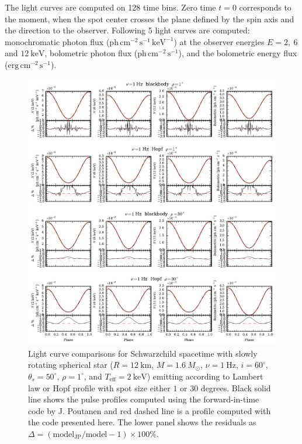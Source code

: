 \documentclass[iop, usenatbib]{emulateapj}
\newcommand{\Msun}{\ensuremath{M_{\odot}}}
\begin{document}
The light curves are computed on 128 time bins.
Zero time $t = 0$ corresponds to the moment, when the spot center crosses the plane defined by the spin axis and the direction to the observer.
Following 5 light curves are computed: monochromatic photon flux ($\mathrm{ph}\,\mathrm{cm}^{-2}\,\mathrm{s}^{-1}\,\mathrm{keV}^{-1}$) at the observer energies $E = 2,~6$ and $12~\mathrm{keV}$, bolometric photon flux ($\mathrm{ph}\,\mathrm{cm}^{-2}\,\mathrm{s}^{-1}$), and the bolometric energy flux ($\mathrm{erg}\,\mathrm{cm}^{-2}\,\mathrm{s}^{-1}$).


\begin{figure}
\centering
\includegraphics[width=18cm]{figs/fig2a.pdf}
\caption{\label{fig:sch_comp1}
  Light curve comparisons for Schwarzchild spacetime with slowly rotating spherical star ($R = 12~\mathrm{km}$, $M = 1.6~\Msun$, $\nu = 1~\mathrm{Hz}$, $i = 60^{\circ}$, $\theta_s = 50^{\circ}$, $\rho = 1^{\circ}$, and $T_{\mathrm{eff}} = 2~\mathrm{keV}$) emitting according to Lambert law or Hopf profile with spot size either $1$ or $30$ degrees.
  Black solid line shows the pulse profiles computed using the forward-in-time code by J. Poutanen and red dashed line is a profile computed with the code presented here.
  The lower panel shows the residuals as $\Delta = (\mathrm{model_{JP}}/\mathrm{model} -1) \times 100\%$.
}
\end{figure}
\end{document}
